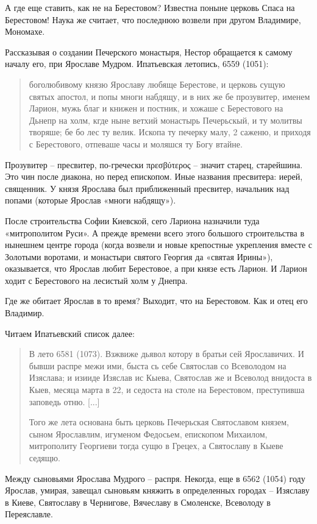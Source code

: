 А где еще ставить, как не на Берестовом? Известна поныне церковь Спаса на Берестовом! Наука же считает, что последнюю возвели при другом Владимире, Мономахе. 

Рассказывая о создании Печерского монастыря, Нес\-тор обращается к самому началу его, при Ярославе Мудром. Ипатьевская летопись, 6559 (1051):

\begin{quotation}
боголюбивому князю Ярославу любяще Берестове, и церковь сущую святых апостол, и попы многи набдящу, и в них же бе прозувитер, именем Ларион, мужь благ и книжен и постник, и хожаше с Берестового на Дьнепр на холм, кгде ныне ветхий монастырь Печерьскый, и ту молитвы творяше; бе бо лес ту велик. Ископа ту печерку малу, 2 саженю, и приходя с Берестового, отпеваше часы и моляшся ту Богу втайне.
\end{quotation}

Прозувитер – пресвитер, по-гречески πρεσβύτερος – значит старец, старейшина. Это чин после диакона, но перед епископом. Иные названия пресвитера: иерей, священник. У князя Ярослава был приближенный пресвитер, начальник над попами (которые Ярослав «многи набдящу»).

После строительства Софии Киевской, сего Лариона назначили туда «митрополитом Руси». А прежде времени всего этого большого строительства в нынешнем центре города (когда возвели и новые крепостные укрепления вместе с Золотыми воротами, и монастыри святого Георгия да «святая Ирины»), оказывается, что Ярослав любит Берестовое, а при князе есть Ларион. И Ларион ходит с Берестового на лесистый холм у Днепра.

Где же обитает Ярослав в то время? Выходит, что на Берестовом. Как и отец его Владимир.

Читаем Ипатьевский список далее:

\begin{quotation}
В лето 6581 (1073). Взжвиже дьявол котору в братьи сей Ярославичих. И бывши распре межи ими, быста сь себе Святослав со Всеволодом на Изяслава; и изииде Изяслав ис Кыева, Святослав же и Всеволод внидоста в Кыев, месяца марта в 22, и седоста на столе на Берестовом, преступивша заповедь отню. [...]

Того же лета основана быть церковь Печерьская Святославом князем, сыном Ярославлим, игуменом Федосьем, епископом Михаилом, митрополиту Георгиеви тогда сущю в Грецех, а Святославу в Кыеве седящю.
\end{quotation}

Между сыновьями Ярослава Мудрого – распря. Некогда, еще в 6562 (1054) году Ярослав, умирая, завещал сыновьям княжить в определенных городах – Изяславу в Киеве, Святославу в Чернигове, Вячеславу в Смоленске, Всеволоду в Переяславле. 

